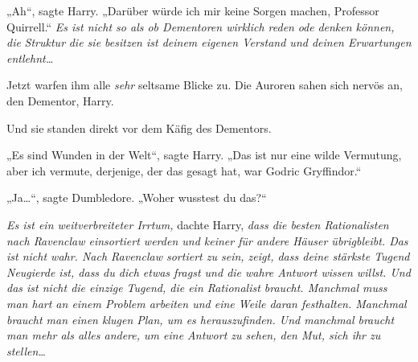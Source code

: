 „Ah“, sagte Harry. „Darüber würde ich mir keine Sorgen machen, Professor Quirrell.“ \emph{Es ist nicht so als ob Dementoren wirklich reden} \emph{ode} \emph{denken können, die} \emph{Struktur} \emph{die sie besitzen ist deinem eigenen Verstand und deinen Erwartungen entlehnt…}

Jetzt warfen ihm alle \emph{sehr} seltsame Blicke zu. Die Auroren sahen sich nervös an, den Dementor, Harry.

Und sie standen direkt vor dem Käfig des Dementors.

„Es sind Wunden in der Welt“, sagte Harry. „Das ist nur eine wilde Vermutung, aber ich vermute, derjenige, der das gesagt hat, war Godric Gryffindor.“

„Ja…“, sagte Dumbledore. „Woher wusstest du das?“

\emph{Es ist ein weitverbreiteter Irrtum,} dachte Harry, \emph{dass die besten Rationalisten nach Ravenclaw einsortiert werden und keiner für andere Häuser übrigbleibt. Das ist nicht wahr. Nach Ravenclaw sortiert zu sein, zeigt, dass deine stärkste Tugend Neugierde ist, dass du dich etwas fragst und die wahre Antwort wissen willst. Und das ist nicht die \emph{einzige} Tugend, die ein Rationalist braucht. Manchmal muss man hart an einem Problem arbeiten und eine Weile daran festhalten. Manchmal braucht man einen klugen Plan, um es herauszufinden. Und manchmal braucht man mehr als alles andere, um eine Antwort zu sehen, den Mut, sich ihr zu stellen…}


